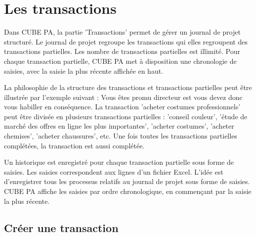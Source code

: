 
\clearpage
\section{Les transactions}

Dans CUBE PA, la partie 'Transactions' permet de gérer un journal de projet structuré. Le journal de projet regroupe les transactions qui elles regroupent des transactions partielles. Les nombre de transactions partielles est illimité. Pour chaque transaction partielle, CUBE PA met à disposition une chronologie de saisies, avec la saisie la plus récente affichée en haut.

\vspace{\baselineskip}

La philosophie de la structure des transactions et transactions partielles peut être illustrée par l'exemple suivant : Vous êtes promu directeur est vous devez donc vous habiller en conséquence. La transaction 'acheter costumes professionnels' peut être divisée en plusieurs transactions partielles : 'conseil couleur', 'étude de marché des offres en ligne les plus importantes', 'acheter costumes', 'acheter chemises', 'acheter chaussures', etc. Une fois toutes les transactions partielles complétées, la transaction est aussi complétée.

\vspace{\baselineskip}

Un historique est enregistré pour chaque transaction partielle sous forme de saisies. Les saisies correspondent aux lignes d'un fichier Excel. L'idée est d'enregistrer tous les processus relatifs au journal de projet sous forme de saisies. CUBE PA affiche les saisies par ordre chronologique, en commençant par la saisie la plus récente.

\subsection{Créer une transaction}

